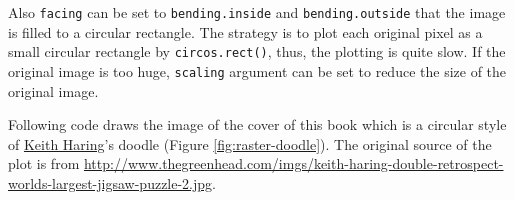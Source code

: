 \documentclass[]{book}
\newenvironment{Shaded}{\begin{snugshade}}{\end{snugshade}}
\newcommand{\KeywordTok}[1]{\textcolor[rgb]{0.13,0.29,0.53}{\textbf{#1}}}
\newcommand{\DataTypeTok}[1]{\textcolor[rgb]{0.13,0.29,0.53}{#1}}
\newcommand{\DecValTok}[1]{\textcolor[rgb]{0.00,0.00,0.81}{#1}}
\newcommand{\FloatTok}[1]{\textcolor[rgb]{0.00,0.00,0.81}{#1}}
\newcommand{\StringTok}[1]{\textcolor[rgb]{0.31,0.60,0.02}{#1}}
\newcommand{\OtherTok}[1]{\textcolor[rgb]{0.56,0.35,0.01}{#1}}
\newcommand{\ControlFlowTok}[1]{\textcolor[rgb]{0.13,0.29,0.53}{\textbf{#1}}}
\newcommand{\OperatorTok}[1]{\textcolor[rgb]{0.81,0.36,0.00}{\textbf{#1}}}
\newcommand{\NormalTok}[1]{#1}
\begin{document}
Also \texttt{facing} can be set to \texttt{bending.inside} and
\texttt{bending.outside} that the image is filled to a circular
rectangle. The strategy is to plot each original pixel as a small
circular rectangle by \texttt{circos.rect()}, thus, the plotting is
quite slow. If the original image is too huge, \texttt{scaling} argument
can be set to reduce the size of the original image.

Following code draws the image of the cover of this book which is a
circular style of
\href{https://en.wikipedia.org/wiki/Keith_Haring}{Keith Haring}'s doodle
(Figure \ref{fig:raster-doodle}). The original source of the plot is
from
\url{http://www.thegreenhead.com/imgs/keith-haring-double-retrospect-worlds-largest-jigsaw-puzzle-2.jpg}.

\begin{Shaded}
\end{Shaded}
\end{document}
